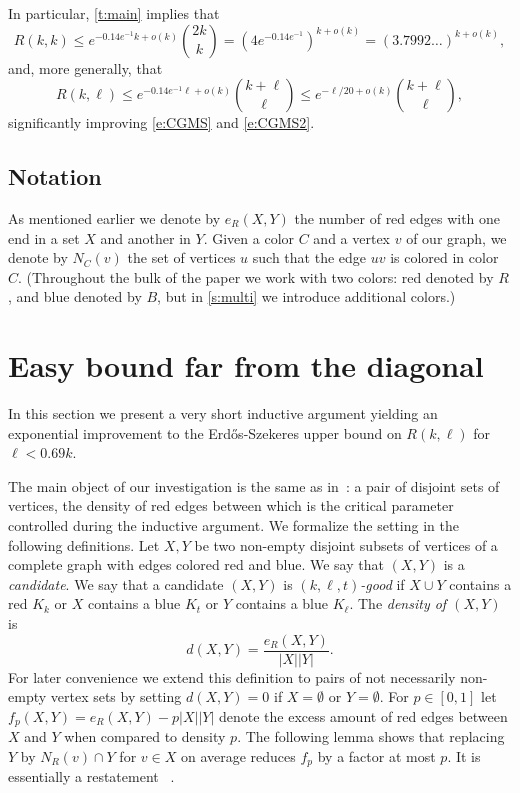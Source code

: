 \documentclass[reqno,final,12pt]{amsart}
\begin{document}
In particular, \cref{t:main} implies that $$R(k,k) \leq e^{-0.14e^{-1}k+o(k)}\binom{2k}{k} = (4e^{-0.14e^{-1}})^{k+o(k)}=(3.7992\ldots)^{k+o(k)}, $$
and, more generally, that
$$R(k,\ell) \leq e^{-0.14e^{-1}\ell+o(k)}\binom{k+\ell}{\ell} \leq e^{-\ell/20+o(k)}\binom{k+\ell}{\ell},$$
significantly improving \eqref{e:CGMS} and \eqref{e:CGMS2}. 

\subsection{Notation} As mentioned earlier we denote by $e_R(X,Y)$ the number of red edges with one end in a set  $X$  and another in $Y$. Given a color $C$ and a vertex $v$ of our graph, we denote by  $N_C(v)$  the set of vertices $u$ such that the edge $uv$ is colored in color $C$. (Throughout the bulk of the paper we work with two colors: red denoted by $R$, and blue denoted by $B$, but in \cref{s:multi} we introduce additional colors.) 

\section{Easy bound far from the diagonal}\label{s:easy}

In this section we present a very short inductive argument yielding an exponential improvement to the Erd\H{o}s-Szekeres upper bound on $R(k,\ell)$ for $\ell < 0.69k.$ 

The main object of our investigation is the same as in~\cite{CGMS23}: a pair of disjoint sets of vertices, the density of red edges between which is the critical parameter controlled during the inductive argument. We formalize the setting in the following definitions.
Let $X,Y$ be two non-empty disjoint subsets of vertices of a complete graph with edges colored red and blue. We say that $(X,Y)$ is a \emph{candidate}. We say that a candidate $(X,Y)$ is \emph{$(k,\ell,t)$-good} if $X \cup Y$ contains a red $K_k$ or $X$ contains a blue $K_t$ or $Y$ contains a blue $K_\ell$. The \emph{density of $(X,Y)$} is  $$d(X,Y) = \frac{e_R(X,Y)}{|X||Y|}.$$ For later convenience we extend this definition to pairs of not necessarily non-empty vertex sets by setting $d(X,Y)=0$ if $X = \emptyset$ or $Y=\emptyset$.
For $p \in [0,1]$ let $f_{p}(X,Y)=e_R(X,Y) - p|X||Y|$ denote the excess amount of red edges between $X$ and $Y$ when compared to density $p$. 
The following lemma shows that replacing $Y$  by $N_R(v) \cap Y$ for $v \in X$ on average  reduces $f_p$ by a factor at most $p$. It is essentially a restatement ~\cite[Observation 5.5]{CGMS23}.   
\end{document}
